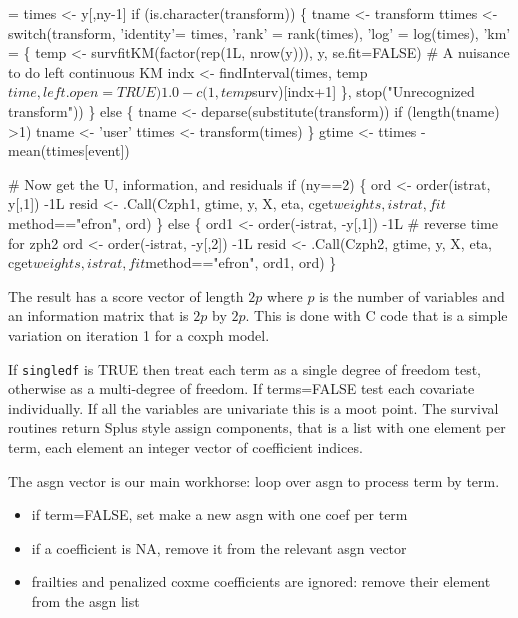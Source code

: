 \documentclass{article}
\newcommand{\code}[1]{\texttt{#1}}
\begin{document}
\begin{nwchunk}
=
 times <- y[,ny-1]
 if (is.character(transform)) \{
     tname <- transform
     ttimes <- switch(transform,
                      'identity'= times,
                      'rank'    = rank(times),
                      'log'     = log(times),
                      'km' = \{
                          temp <- survfitKM(factor(rep(1L, nrow(y))),
                                            y, se.fit=FALSE)
                          # A nuisance to do left continuous KM
                          indx <- findInterval(times, temp$time, left.open=TRUE)
                          1.0 - c(1, temp$surv)[indx+1]
                      \},
                      stop("Unrecognized transform"))
         \}
     else \{
         tname <- deparse(substitute(transform))
         if (length(tname) >1) tname <- 'user'
         ttimes <- transform(times)
         \}
     gtime <- ttimes - mean(ttimes[event]) 
 
     # Now get the U, information, and residuals
     if (ny==2) \{
         ord <- order(istrat, y[,1]) -1L
         resid <- .Call(Czph1, gtime, y, X, eta,
                         cget$weights, istrat, fit$method=="efron", ord)
     \}
     else \{
         ord1 <- order(-istrat, -y[,1]) -1L   # reverse time for zph2
         ord  <- order(-istrat, -y[,2]) -1L
         resid <- .Call(Czph2, gtime, y, X, eta,
                         cget$weights, istrat, fit$method=="efron", 
                         ord1, ord)
     \}
\end{nwchunk}

The result has a score vector of length $2p$ where $p$ is the number of
variables and an information matrix that is $2p$ by $2p$.
This is done with C code that
is a simple variation on iteration 1 for a coxph model.

If \code{singledf} is TRUE then treat each term as a single degree of
freedom test, otherwise as a multi-degree of freedom.
If terms=FALSE test each covariate individually.
If all the variables are univariate this is a moot point.
The survival routines return Splus style assign components, that is a list
with one element per term, each element an integer vector of coefficient
indices.

The asgn vector is our main workhorse: loop over asgn to process term by
term.
\begin{itemize}
  \item if term=FALSE, set make a new asgn with one coef per term
  \item if a coefficient is NA, remove it from the relevant asgn vector
  \item frailties and penalized coxme coefficients are ignored: remove
    their element from the asgn list
\end{itemize} 
   
\end{document}
